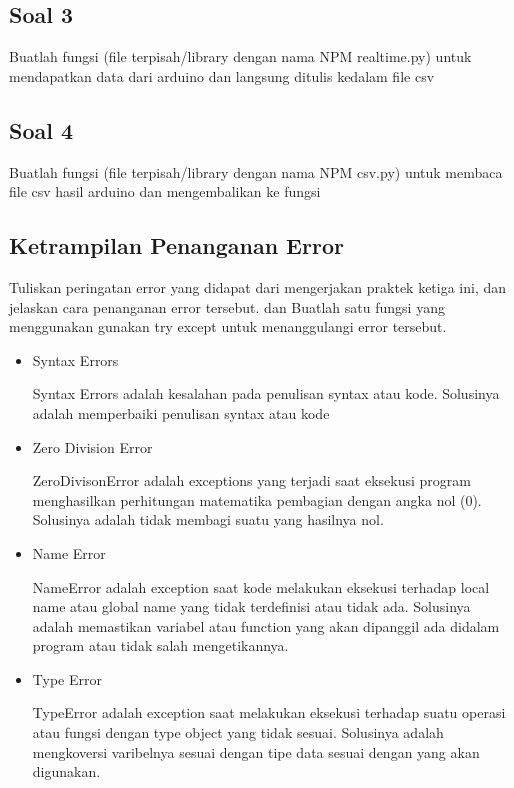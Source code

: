 \subsection{Soal 3}
Buatlah fungsi (file terpisah/library dengan nama NPM realtime.py) untuk mendapatkan data dari arduino dan langsung ditulis kedalam file csv



\subsection{Soal 4}
Buatlah fungsi (file terpisah/library dengan nama NPM csv.py) untuk membaca file csv hasil arduino dan mengembalikan ke fungsi


\subsection{Ketrampilan Penanganan Error}
Tuliskan peringatan error yang didapat dari mengerjakan praktek ketiga ini, dan jelaskan cara penanganan error tersebut. dan Buatlah satu fungsi yang menggunakan gunakan try except untuk menanggulangi error tersebut.
\begin{itemize}
\item Syntax Errors

Syntax Errors adalah kesalahan pada penulisan syntax atau kode. Solusinya adalah memperbaiki penulisan syntax atau kode

\item Zero Division Error

ZeroDivisonError adalah exceptions yang terjadi saat eksekusi program menghasilkan perhitungan matematika pembagian dengan angka nol (0). Solusinya adalah tidak membagi suatu yang hasilnya nol.

\item Name Error

NameError adalah exception saat kode melakukan eksekusi terhadap local name atau global name yang tidak terdefinisi atau tidak ada. Solusinya adalah memastikan variabel atau function yang akan dipanggil ada didalam program atau tidak salah mengetikannya.

\item Type Error

TypeError adalah exception saat melakukan eksekusi terhadap suatu operasi atau fungsi dengan type object yang tidak sesuai. Solusinya adalah mengkoversi varibelnya sesuai dengan tipe data sesuai dengan yang akan digunakan.

\end{itemize}







